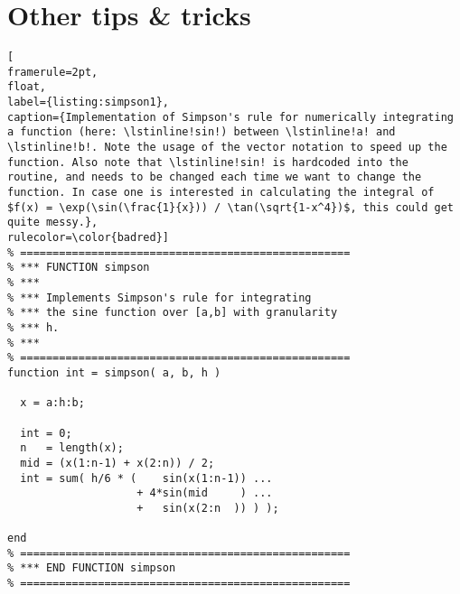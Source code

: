 %
% 
% 
% 
%
\newpage
\section{Other tips \& tricks}

\begin{lstlisting}[
framerule=2pt,
float,
label={listing:simpson1},
caption={Implementation of Simpson's rule for numerically integrating a function (here: \lstinline!sin!) between \lstinline!a! and \lstinline!b!. Note the usage of the vector notation to speed up the function. Also note that \lstinline!sin! is hardcoded into the routine, and needs to be changed each time we want to change the function. In case one is interested in calculating the integral of $f(x) = \exp(\sin(\frac{1}{x})) / \tan(\sqrt{1-x^4})$, this could get quite messy.},
rulecolor=\color{badred}]
% ===================================================
% *** FUNCTION simpson
% ***
% *** Implements Simpson's rule for integrating
% *** the sine function over [a,b] with granularity
% *** h.
% ***
% ===================================================
function int = simpson( a, b, h )

  x = a:h:b;

  int = 0;
  n   = length(x);
  mid = (x(1:n-1) + x(2:n)) / 2;
  int = sum( h/6 * (    sin(x(1:n-1)) ...
                    + 4*sin(mid     ) ...
                    +   sin(x(2:n  )) ) );

end 
% ===================================================
% *** END FUNCTION simpson
% ===================================================
\end{lstlisting}

